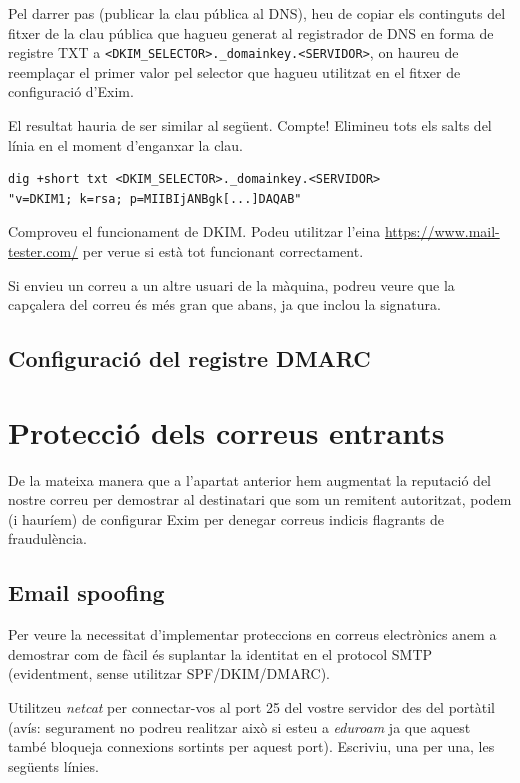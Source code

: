 \documentclass{practicaitic}
\begin{document}
Pel darrer pas (publicar la clau pública al DNS), heu de copiar els continguts
del fitxer de la clau pública que hagueu generat al registrador de DNS en
forma de registre TXT a \texttt{<DKIM\_SELECTOR>.\_domainkey.<SERVIDOR>}, on 
haureu de reemplaçar el primer valor pel selector que hagueu utilitzat en el
fitxer de configuració d'Exim.

El resultat hauria de ser similar al següent. Compte! Elimineu tots els salts
del línia en el moment d'enganxar la clau.

\begin{verbatim}
dig +short txt <DKIM_SELECTOR>._domainkey.<SERVIDOR>
"v=DKIM1; k=rsa; p=MIIBIjANBgk[...]DAQAB"
\end{verbatim}

\begin{tasca}
Comproveu el funcionament de DKIM. Podeu utilitzar l'eina
\url{https://www.mail-tester.com/} per verue si està tot funcionant correctament.

Si envieu un correu a un altre usuari de la màquina, podreu veure que la capçalera
del correu és més gran que abans, ja que inclou la signatura.
\end{tasca}

\subsection{Configuració del registre DMARC}


\section{Protecció dels correus entrants}

De la mateixa manera que a l'apartat anterior hem augmentat la reputació
del nostre correu per demostrar al destinatari que som un remitent autoritzat,
podem (i hauríem) de configurar Exim per denegar correus indicis flagrants de
fraudulència.

\subsection{Email spoofing}

Per veure la necessitat d'implementar proteccions en correus electrònics
anem a demostrar com de fàcil és suplantar la identitat en el protocol SMTP
(evidentment, sense utilitzar SPF/DKIM/DMARC).

\begin{tasca}
Utilitzeu \textit{netcat} per connectar-vos al port 25 del vostre servidor des
del portàtil (avís: segurament no podreu realitzar això si esteu a
\textit{eduroam} ja que aquest també bloqueja connexions sortints per aquest
port). Escriviu, una per una, les següents línies.
\end{tasca}
\end{document}
